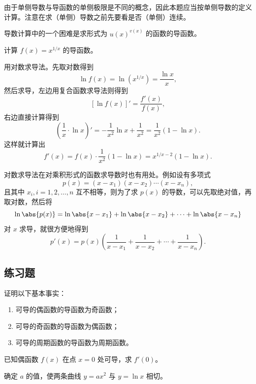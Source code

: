 \begin{xremark}
由于单侧导数与导函数的单侧极限是不同的概念，因此本题应当按单侧导数的定义计算。注意在求（单侧）导数之前先要看是否（单侧）连续。
\end{xremark}

导数计算中的一个困难是求形式为 $u(x)^{v(x)}$ 的函数的导函数。

\begin{xexample}[6.1.7]
计算 $f(x)=x^{1/x}$ 的导函数。
\end{xexample}
\begin{xsolution}
用对数求导法。先取对数得到
\[
  \ln f(x)=\ln(x^{1/x})=\frac{\ln x}{x},
\]
然后求导，左边用复合函数求导法则得到
\[
  [\ln f(x)]'=\frac{f'(x)}{f(x)},
\]
右边直接计算得到
\[
  \left(\frac1x\cdot\ln x\right)'=-\frac{1}{x^2}\ln x+\frac{1}{x^2}=\frac{1}{x^2}(1-\ln x).
\]
这样就计算出
\[
  f'(x)=f(x)\cdot\frac{1}{x^2}(1-\ln x)=x^{1/x-2}(1-\ln x).
\]
\end{xsolution}

\begin{xremark}
对数求导法在对乘积形式的函数求导数时也有用处。例如设有多项式
\[
  p(x)=(x-x_1)(x-x_2)\cdots(x-x_n),
\]
且其中 $x_i,i=1,2,\ldots,n$ 互不相等，则为了求 $p(x)$ 的导数，可以先取绝对值，再取对数，然后将
\[
  \ln\abs{p(x)}=\ln\abs{x-x_1}+\ln\abs{x-x_2}+\cdots+\ln\abs{x-x_n}
\]
对 $x$ 求导，就很方便地得到
\[
  p'(x)=p(x)\left(\frac1{x-x_1}+\frac1{x-x_2}+\cdots+\frac1{x-x_n}\right).
\]
\end{xremark}

\subsection{练习题}

\begin{xexercise}[1]
证明以下基本事实：
  \begin{enumerate}[label=(\arabic*)]
    \item 可导的偶函数的导函数为奇函数；
    \item 可导的奇函数的导函数为偶函数；
    \item 可导的周期函数的导函数为周期函数。
  \end{enumerate}
\end{xexercise}

\begin{xexercise}[2]
已知偶函数 $f(x)$ 在点 $x=0$ 处可导，求 $f'(0)$。
\end{xexercise}

\begin{xexercise}[3]
确定 $a$ 的值，使两条曲线 $y=ax^2$ 与 $y=\ln x$ 相切。
\end{xexercise}

